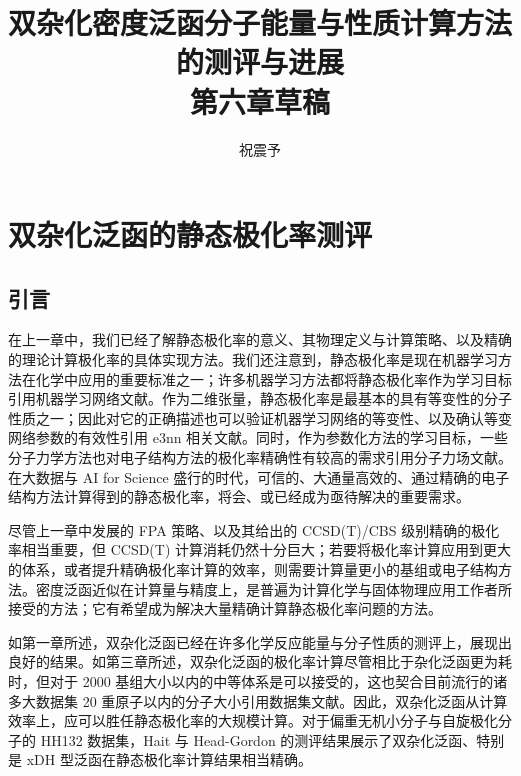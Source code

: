 



\title{\textbf{双杂化密度泛函分子能量与性质计算方法的测评与进展\\第六章草稿}}
\author{祝震予}
\maketitle
\vspace{-10pt}

\tableofcontents


\setcounter{section}{5}

\section{双杂化泛函的静态极化率测评}

\subsection{引言}

在上一章中，我们已经了解静态极化率的意义、其物理定义与计算策略、以及精确的理论计算极化率的具体实现方法。我们还注意到，静态极化率是现在机器学习方法在化学中应用的重要标准之一；许多机器学习方法都将静态极化率作为学习目标\alert{引用机器学习网络文献}。作为二维张量，静态极化率是最基本的具有等变性的分子性质之一；因此对它的正确描述也可以验证机器学习网络的等变性、以及确认等变网络参数的有效性\alert{引用 e3nn 相关文献}。同时，作为参数化方法的学习目标，一些分子力学方法也对电子结构方法的极化率精确性有较高的需求\alert{引用分子力场文献}。在大数据与 AI for Science 盛行的时代，可信的、大通量高效的、通过精确的电子结构方法计算得到的静态极化率，将会、或已经成为亟待解决的重要需求。

尽管上一章中发展的 FPA 策略、以及其给出的 CCSD(T)/CBS 级别精确的极化率相当重要，但 CCSD(T) 计算消耗仍然十分巨大；若要将极化率计算应用到更大的体系，或者提升精确极化率计算的效率，则需要计算量更小的基组或电子结构方法。密度泛函近似在计算量与精度上，是普遍为计算化学与固体物理应用工作者所接受的方法；它有希望成为解决大量精确计算静态极化率问题的方法。

如第一章所述，双杂化泛函已经在许多化学反应能量与分子性质的测评上，展现出良好的结果。如第三章所述，双杂化泛函的极化率计算尽管相比于杂化泛函更为耗时，但对于 2000 基组大小以内的中等体系是可以接受的，这也契合目前流行的诸多大数据集 20 重原子以内的分子大小\alert{引用数据集文献}。因此，双杂化泛函从计算效率上，应可以胜任静态极化率的大规模计算。对于偏重无机小分子与自旋极化分子的 HH132 数据集，Hait 与 Head-Gordon 的测评结果展示了双杂化泛函、特别是 xDH 型泛函在静态极化率计算结果相当精确\cite{Hait-Head-Gordon.PCCP.2018}。

